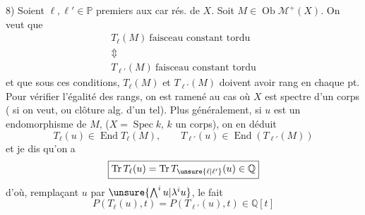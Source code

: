 8) Soient $\ell,\ell'\in\mathbb{P}$ premiers aux car rés.
de $X$. Soit $M\in\operatorname{Ob}\mathcal{M}^+(X)$. On veut
que
\[
\begin{array}{c}
T_\ell(M)\ \text{faisceau constant tordu}\\
\Updownarrow\\
T_{\ell'}(M)\ \text{faisceau constant tordu}
\end{array}
\]
et que sous ces conditions, $T_\ell(M)$ et
$T_{\ell'}(M)$ doivent avoir  rang en chaque
pt. Pour vérifier l'égalité des rangs, on
est ramené au cas où $X$ est  spectre d'un
corps ( si on veut,  ou clôture alg.
d'un tel). Plus généralement, si
$u$ est un endomorphisme de $M$,
($X=\operatorname{Spec}k$, $k$ un corps), on en déduit
\[
T_\ell(u)\in\operatorname{End}T_\ell(M),\qquad
T_{\ell'}(u)\in\operatorname{End}(T_{\ell'}(M))
\]
et je dis qu'on a
\[
\boxed{\operatorname{Tr}T_\ell(u)=\operatorname{Tr}T_{\unsure{\ell|\ell'}}(u)
\in\mathbb{Q}}
\]
d'où, remplaçant $u$ par $\unsure{\bigwedge^i u|\lambda^i u}$, le fait
\[
\boxed{P(T_\ell(u),t)=P(T_{\ell'}(u),t)\in\mathbb{Q}[t]}
\]
